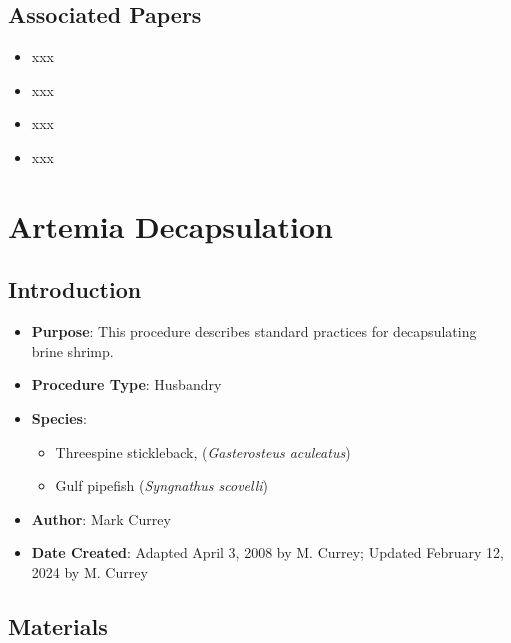 \documentclass[
  letterpaper,
  DIV=11,
  numbers=noendperiod]{scrreprt}
\providecommand{\tightlist}{%
  \setlength{\itemsep}{0pt}\setlength{\parskip}{0pt}}\usepackage{longtable,booktabs,array}
\begin{document}
\hypertarget{associated-papers-16}{%
\section{Associated Papers}\label{associated-papers-16}}

\begin{itemize}
\tightlist
\item
  xxx
\item
  xxx
\item
  xxx
\item
  xxx
\end{itemize}

\hypertarget{sec-husbandry-brineshrimp_decap}{%
\chapter{Artemia Decapsulation}\label{sec-husbandry-brineshrimp_decap}}

\hypertarget{introduction-29}{%
\section{Introduction}\label{introduction-29}}

\begin{itemize}
\tightlist
\item
  \textbf{Purpose}: This procedure describes standard practices for
  decapsulating brine shrimp.
\item
  \textbf{Procedure Type}: Husbandry
\item
  \textbf{Species}:

  \begin{itemize}
  \tightlist
  \item
    Threespine stickleback, (\emph{Gasterosteus aculeatus})
  \item
    Gulf pipefish (\emph{Syngnathus scovelli})
  \end{itemize}
\item
  \textbf{Author}: Mark Currey
\item
  \textbf{Date Created}: Adapted April 3, 2008 by M. Currey; Updated
  February 12, 2024 by M. Currey
\end{itemize}

\hypertarget{materials-29}{%
\section{Materials}\label{materials-29}}
\end{document}
